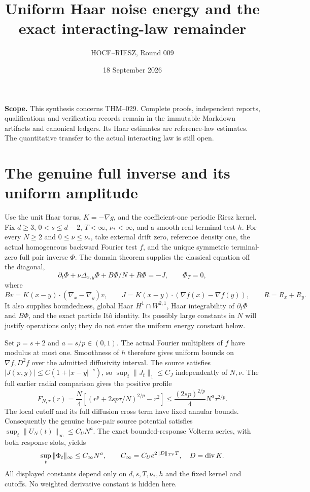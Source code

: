 \documentclass[10pt]{article}
\title{Uniform Haar noise energy and the exact interacting-law remainder}
\author{HOCF--RIESZ, Round 009}
\date{18 September 2026}
\begin{document}
\maketitle
\noindent\textbf{Scope.} This synthesis concerns THM--029. Complete proofs,
independent reports, qualifications and verification records remain in the
immutable Markdown artifacts and canonical ledgers. Its Haar estimates are
reference-law estimates. The quantitative transfer to the actual interacting
law is still open.

\section*{The genuine full inverse and its uniform amplitude}
Use the unit Haar torus, $K=-\nabla g$, and the coefficient-one periodic Riesz
kernel. Fix $d\ge3$, $0<s\le d-2$, $T<\infty$, $\nu_*<\infty$, and a smooth
real terminal test $h$. For every $N\ge2$ and $0\le\nu\le\nu_*$, take external
drift zero, reference density one, the actual homogeneous backward Fourier
test $f$, and the unique symmetric terminal-zero full pair inverse $\Phi$.
The domain theorem supplies the classical equation off the diagonal,
\[
 \partial_t\Phi+\nu\Delta_{x,y}\Phi+B\Phi/N+R\Phi=-J,
 \qquad \Phi_T=0,
\]
where
\[
 Bv=K(x-y)\cdot(\nabla_x-\nabla_y)v,\qquad
 J=K(x-y)\cdot(\nabla f(x)-\nabla f(y)),\qquad R=R_x+R_y.
\]
It also supplies boundedness, global Haar $H^1\cap W^{2,1}$, Haar integrability
of $\partial_t\Phi$ and $B\Phi$, and the exact particle It\^o identity. Its
possibly large constants in $N$ will justify operations only; they do not enter
the uniform energy constant below.

Set $p=s+2$ and $a=s/p\in(0,1)$. The actual Fourier multipliers of $f$ have
modulus at most one. Smoothness of $h$ therefore gives uniform bounds on
$\nabla f,D^2f$ over the admitted diffusivity interval. The source satisfies
$|J(x,y)|\le C(1+|x-y|^{-s})$, so $\sup_t\|J_t\|_1\le C_J$ independently of
$N,\nu$. The full earlier radial comparison gives the positive profile
\[
 F_{N,\tau}(r)=\frac N4\left[
 (r^p+2sp\tau/N)^{2/p}-r^2\right]
 \le \frac{(2sp)^{2/p}}4N^a\tau^{2/p}.
\]
The local cutoff and its full diffusion cross term have fixed annular bounds.
Consequently the genuine base-pair source potential satisfies
$\sup_t\|U_N(t)\|_\infty\le C_U N^a$. The exact bounded-response Volterra
series, with both response slots, yields
\[
 \sup_t\|\Phi_t\|_\infty\le C_\infty N^a,
 \qquad C_\infty=C_Ue^{2\|D\|_{\rm TV}T},\quad D=\operatorname{div}K.
\]
All displayed constants depend only on $d,s,T,\nu_*,h$ and the fixed kernel
and cutoffs. No weighted derivative constant is hidden here.
\end{document}
